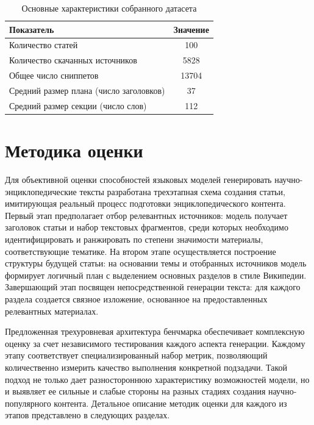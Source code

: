 \documentclass{article}
\theoremstyle{definition}
\theoremstyle{plain}
\begin{document}
\begin{table}[htb]
  \centering
  \caption{Основные характеристики собранного датасета}
  \label{tab:dataset}
  \begin{tabular}{lc}
    \hline
    \textbf{Показатель} & \textbf{Значение} \\
    \hline
    Количество статей                             & 100    \\
    \hline
    Количество скачанных источников               & 5828  \\
    \hline
    Общее число сниппетов                         & 13704  \\
    \hline
    Средний размер плана (число заголовков)       & 37    \\
    \hline
    Средний размер секции (число слов)            & 112   \\
    \hline
  \end{tabular}
\end{table}


\section*{Методика оценки}
Для объективной оценки способностей языковых моделей генерировать научно-энциклопедические тексты разработана трехэтапная схема создания статьи, имитирующая реальный процесс подготовки энциклопедического контента. 
Первый этап предполагает отбор релевантных источников: модель получает заголовок статьи и набор текстовых фрагментов, среди которых необходимо идентифицировать и ранжировать по степени значимости материалы, соответствующие тематике. 
На втором этапе осуществляется построение структуры будущей статьи: на основании темы и отобранных источников модель формирует логичный план с выделением основных разделов в стиле Википедии. 
Завершающий этап посвящен непосредственной генерации текста: для каждого раздела создается связное изложение, основанное на предоставленных релевантных материалах. 

Предложенная трехуровневая архитектура бенчмарка обеспечивает комплексную оценку за счет независимого тестирования каждого аспекта генерации. 
Каждому этапу соответствует специализированный набор метрик, позволяющий количественно измерить качество выполнения конкретной подзадачи. 
Такой подход не только дает разностороннюю характеристику возможностей модели, но и выявляет ее сильные и слабые стороны на разных стадиях создания научно-популярного контента. 
Детальное описание методик оценки для каждого из этапов представлено в следующих разделах.
\end{document}
